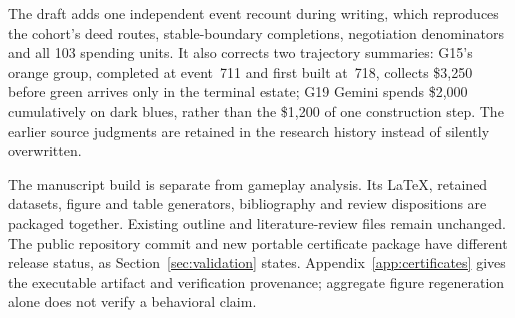 The draft adds one independent event recount during writing, which reproduces the cohort's deed routes, stable-boundary completions, negotiation denominators and all 103 spending units. It also corrects two trajectory summaries: G15's orange group, completed at event~711 and first built at~718, collects \$3,250 before green arrives only in the terminal estate; G19 Gemini spends \$2,000 cumulatively on dark blues, rather than the \$1,200 of one construction step. The earlier source judgments are retained in the research history instead of silently overwritten.

The manuscript build is separate from gameplay analysis. Its LaTeX, retained datasets, figure and table generators, bibliography and review dispositions are packaged together. Existing outline and literature-review files remain unchanged. The public repository commit and new portable certificate package have different release status, as Section~\ref{sec:validation} states. Appendix~\ref{app:certificates} gives the executable artifact and verification provenance; aggregate figure regeneration alone does not verify a behavioral claim.

